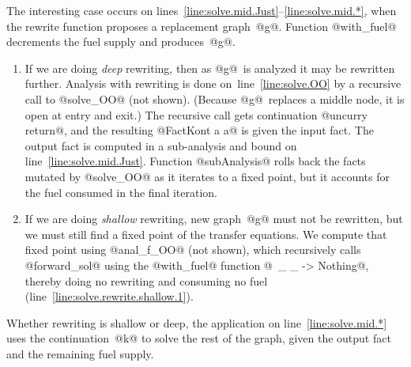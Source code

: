 \documentclass[blockstyle,preprint,natbib,nocopyrightspace]{sigplanconf}
\newcommand\lineref[1]{line~\ref{line:#1}}
\newcommand\linerangeref[2]{\mbox{lines~\ref{line:#1}--\ref{line:#2}}}
\def\authornote#1{\unskip\relax}
\newcommand{\simon}[1]{\authornote{SLPJ: #1}}
\begin{document}
The interesting case occurs on \linerangeref{solve.mid.Just}{solve.mid.*},
when the rewrite function 
proposes a replacement graph~@g@.
Function @with_fuel@ decrements the fuel supply and produces~@g@.
\begin{enumerate}
\item
If we are doing \emph{deep} rewriting, then as @g@~is analyzed
it may be rewritten further.
Analysis with rewriting is done
on~\lineref{solve.OO}
by a recursive call to @solve_OO@ (not shown).
(Because @g@~replaces a middle node, it is open at entry and exit.)
The recursive call gets continuation @uncurry return@, and the
resulting @FactKont a a@ is given
the input fact.
The output fact is computed in a sub-analysis
and bound on
\lineref{solve.mid.Just}. 
%
Function @subAnalysis@ rolls back the facts mutated
by @solve_OO@ as it iterates to a fixed point, but it accounts for
the fuel consumed in the final iteration.
\item
If we are doing \emph{shallow} rewriting,  new graph~@g@ must not be
rewritten, but we must still find a fixed point of the transfer
equations.
We compute that fixed point using @anal_f_OO@ (not shown), which  recursively calls
@forward_sol@ using the @with_fuel@ function
@\ _ _ -> Nothing@, 
thereby doing no rewriting and consuming no fuel
(\lineref{solve.rewrite.shallow.1}).
\simon{This business of passing in a different @with\_fuel@ seems terribly
clumsy to me.  The obvious thing would be to add a third constructor @NoRewrite@
to the @RewritingDepth@ type, so that we could call @forward\_sol@ saying
``don't do any rewriting at all''.  Would that even elimiate the higher order
@with\_fuel@ parameter altogether?  What is it used for? 
NR:~If you re-examine the structure of the case expressions, you'll
see that @NoRewrite@ as a third constructor would leave to
inexhaustive pattern matching.  A Boolean would do.
Function @with\_fuel@ is also
used to decrement the fuel supply.
Combining the decrement with the test in a higher-order function
simplified the code significantly (and made it impossible to forget to
decrement).
}
%
\end{enumerate}
Whether rewriting is shallow or deep, the application on
\lineref{solve.mid.*} uses the continuation~@k@ to solve the rest of
the graph, given the output fact and the remaining fuel supply.
\end{document}
